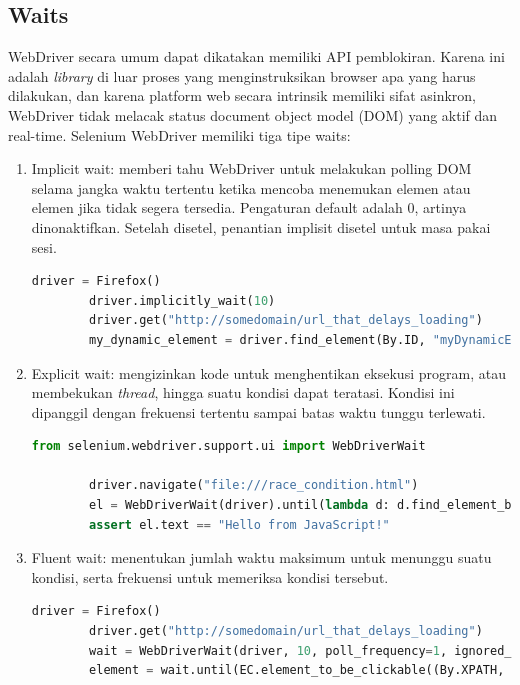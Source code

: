 \subsection{Waits}
WebDriver secara umum dapat dikatakan memiliki API pemblokiran. Karena ini adalah \textit{library} di luar proses yang menginstruksikan browser apa yang harus dilakukan, dan karena platform web secara intrinsik memiliki sifat asinkron, WebDriver tidak melacak status document object model (DOM) yang aktif dan real-time. Selenium WebDriver memiliki tiga tipe waits:
\begin{enumerate}
	\item Implicit wait: memberi tahu WebDriver untuk melakukan polling DOM selama jangka waktu tertentu ketika mencoba menemukan elemen atau elemen jika tidak segera tersedia. Pengaturan default adalah 0, artinya dinonaktifkan. Setelah disetel, penantian implisit disetel untuk masa pakai sesi.
	\begin{lstlisting}[language=python, caption=Contoh kode Implicit wait, label=kode:2:implicit]
		driver = Firefox()
		driver.implicitly_wait(10)
		driver.get("http://somedomain/url_that_delays_loading")
		my_dynamic_element = driver.find_element(By.ID, "myDynamicElement")
	\end{lstlisting}
	\item Explicit wait: mengizinkan kode untuk menghentikan eksekusi program, atau membekukan \textit{thread}, hingga suatu kondisi dapat teratasi. Kondisi ini dipanggil dengan frekuensi tertentu sampai batas waktu tunggu terlewati.
	\begin{lstlisting}[language=python, caption=Contoh kode Explicit wait, label=kode:2:explicit]
		from selenium.webdriver.support.ui import WebDriverWait
		
		driver.navigate("file:///race_condition.html")
		el = WebDriverWait(driver).until(lambda d: d.find_element_by_tag_name("p"))
		assert el.text == "Hello from JavaScript!"
	\end{lstlisting}
	\item Fluent wait: menentukan jumlah waktu maksimum untuk menunggu suatu kondisi, serta frekuensi untuk memeriksa kondisi tersebut.
	\begin{lstlisting}[language=python, caption=Contoh kode FluentWait, label=kode:2:FluentWait]
		driver = Firefox()
		driver.get("http://somedomain/url_that_delays_loading")
		wait = WebDriverWait(driver, 10, poll_frequency=1, ignored_exceptions=[ElementNotVisibleException, ElementNotSelectableException])
		element = wait.until(EC.element_to_be_clickable((By.XPATH, "//div")))
	\end{lstlisting}
\end{enumerate}










